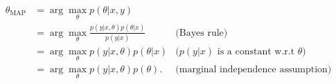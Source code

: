 \begin{answer}
\begin{align*}
\theta_{\text{MAP}} &= \arg\max_\theta p(\theta|x,y) \\
&= \arg\max_\theta \frac{p(y|x,\theta) p(\theta|x)}{p(y|x)} & \text{(Bayes rule)}\\
&= \arg\max_\theta p(y|x,\theta) p(\theta|x) & \text{($p(y|x)$ is a constant w.r.t $\theta$)} \\
&= \arg\max_\theta p(y|x,\theta) p(\theta). & \text{(marginal independence assumption)}
\end{align*}

\end{answer}
